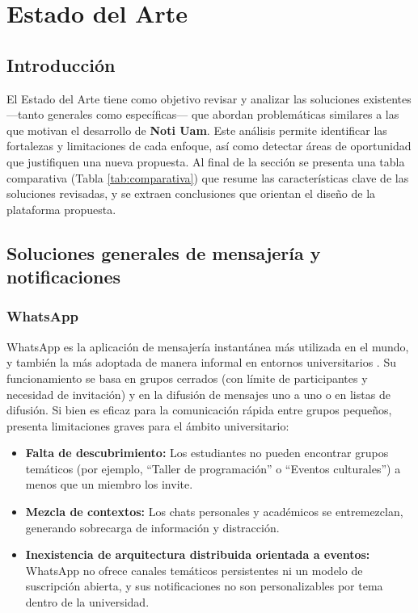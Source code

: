 \section{Estado del Arte}

\subsection{Introducción}

El Estado del Arte tiene como objetivo revisar y analizar las soluciones existentes —tanto generales como específicas— que abordan problemáticas similares a las que motivan el desarrollo de \textbf{Noti Uam}. Este análisis permite identificar las fortalezas y limitaciones de cada enfoque, así como detectar áreas de oportunidad que justifiquen una nueva propuesta. Al final de la sección se presenta una tabla comparativa (Tabla \ref{tab:comparativa}) que resume las características clave de las soluciones revisadas, y se extraen conclusiones que orientan el diseño de la plataforma propuesta.

\subsection{Soluciones generales de mensajería y notificaciones}

\subsubsection{WhatsApp}

WhatsApp es la aplicación de mensajería instantánea más utilizada en el mundo, y también la más adoptada de manera informal en entornos universitarios \cite{bucheli2020whatsapp}. Su funcionamiento se basa en grupos cerrados (con límite de participantes y necesidad de invitación) y en la difusión de mensajes uno a uno o en listas de difusión. Si bien es eficaz para la comunicación rápida entre grupos pequeños, presenta limitaciones graves para el ámbito universitario:

\begin{itemize}
    \item \textbf{Falta de descubrimiento:} Los estudiantes no pueden encontrar grupos temáticos (por ejemplo, “Taller de programación” o “Eventos culturales”) a menos que un miembro los invite.
    \item \textbf{Mezcla de contextos:} Los chats personales y académicos se entremezclan, generando sobrecarga de información y distracción.
    \item \textbf{Inexistencia de arquitectura distribuida orientada a eventos:} WhatsApp no ofrece canales temáticos persistentes ni un modelo de suscripción abierta, y sus notificaciones no son personalizables por tema dentro de la universidad.
\end{itemize}

